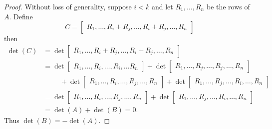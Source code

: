 \documentclass[linearalgebra]{subfiles}
\begin{document}
    \begin{proof}
        Without loss of generality, suppose $i<k$ and let $R_1, \ldots, R_n$ be the rows of $A$. Define
        \begin{equation*}
            C = \begin{bmatrix}
                R_1, \ldots, R_i+R_j, \ldots, R_i+R_j, \ldots, R_n
            \end{bmatrix}
        \end{equation*}
        then
        \begin{align*}
            \det(C) & = \det 
            \begin{bmatrix}
                R_1, \ldots, R_i+R_j, \ldots, R_i+R_j, \ldots, R_n
            \end{bmatrix} \\
                    & = \det 
            \begin{bmatrix}
                R_1, \ldots, R_i, \ldots, R_i, \ldots R_n
            \end{bmatrix}
            + \det 
            \begin{bmatrix}
                R_1, \ldots, R_j, \ldots, R_j, \ldots, R_n
            \end{bmatrix} \\
                    & \hspace{1cm} + \det 
            \begin{bmatrix}
                R_1, \ldots, R_i, \ldots, R_j, \ldots, R_n
            \end{bmatrix}
            + \det 
            \begin{bmatrix}
                R_1, \ldots, R_j, \ldots, R_i, \ldots, R_n
            \end{bmatrix} \\
                   & = \det 
                   \begin{bmatrix}
                       R_1, \ldots, R_i, \ldots, R_j, \ldots, R_n
                   \end{bmatrix}
                   + \det 
                   \begin{bmatrix}
                       R_1, \ldots, R_j, \ldots, R_i, \ldots, R_n
                   \end{bmatrix} \\
                   & = \det(A) + \det(B) = 0.
        \end{align*} 
        Thus $\det(B)=-\det(A)$.
    \end{proof}
\end{document}
